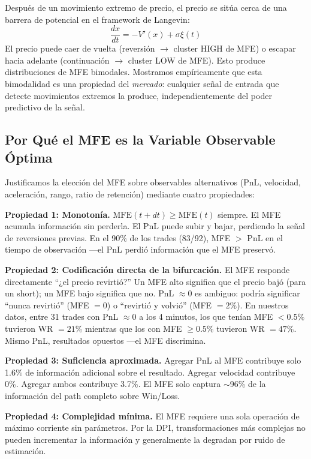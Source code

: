 \documentclass[11pt,a4paper]{article}
\begin{document}
Después de un movimiento extremo de precio, el precio se sitúa cerca de una barrera de potencial en el framework de Langevin:
\begin{equation}
    \frac{dx}{dt} = -V'(x) + \sigma\xi(t)
\end{equation}
El precio puede caer de vuelta (reversión $\rightarrow$ cluster HIGH de MFE) o escapar hacia adelante (continuación $\rightarrow$ cluster LOW de MFE). Esto produce distribuciones de MFE bimodales. Mostramos empíricamente que esta bimodalidad es una propiedad del \emph{mercado}: cualquier señal de entrada que detecte movimientos extremos la produce, independientemente del poder predictivo de la señal.

\subsection{Por Qué el MFE es la Variable Observable Óptima}

Justificamos la elección del MFE sobre observables alternativos (PnL, velocidad, aceleración, rango, ratio de retención) mediante cuatro propiedades:

\textbf{Propiedad 1: Monotonía.} $\text{MFE}(t+dt) \geq \text{MFE}(t)$ siempre. El MFE acumula información sin perderla. El PnL puede subir y bajar, perdiendo la señal de reversiones previas. En el 90\% de los trades (83/92), MFE $>$ PnL en el tiempo de observación ---el PnL perdió información que el MFE preservó.

\textbf{Propiedad 2: Codificación directa de la bifurcación.} El MFE responde directamente ``¿el precio revirtió?'' Un MFE alto significa que el precio bajó (para un short); un MFE bajo significa que no. PnL $\approx 0$ es ambiguo: podría significar ``nunca revirtió'' (MFE $= 0$) o ``revirtió y volvió'' (MFE $= 2\%$). En nuestros datos, entre 31 trades con PnL $\approx 0$ a los 4 minutos, los que tenían MFE $< 0.5\%$ tuvieron WR $= 21\%$ mientras que los con MFE $\geq 0.5\%$ tuvieron WR $= 47\%$. Mismo PnL, resultados opuestos ---el MFE discrimina.

\textbf{Propiedad 3: Suficiencia aproximada.} Agregar PnL al MFE contribuye solo 1.6\% de información adicional sobre el resultado. Agregar velocidad contribuye 0\%. Agregar ambos contribuye 3.7\%. El MFE solo captura $\sim$96\% de la información del path completo sobre Win/Loss.

\textbf{Propiedad 4: Complejidad mínima.} El MFE requiere una sola operación de máximo corriente sin parámetros. Por la DPI, transformaciones más complejas no pueden incrementar la información y generalmente la degradan por ruido de estimación.
\end{document}
